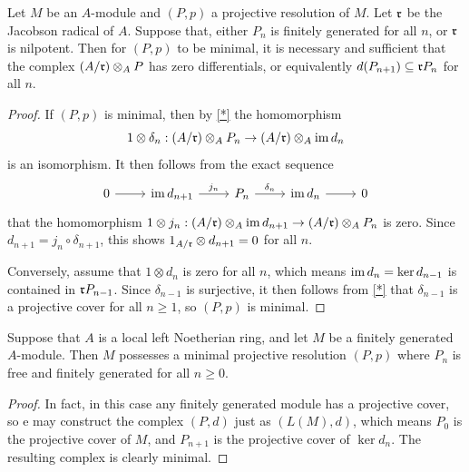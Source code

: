 \begin{proposition}\label{module minima projective resolution iff tensor with A/r}
Let $M$ be an $A$-module and $(P,p)$ a projective resolution of $M$. Let $\mathfrak{r}$ be the Jacobson radical of $A$. Suppose that, either $P_n$ is finitely generated for all $n$, or $\mathfrak{r}$ is nilpotent. Then for $(P,p)$ to be minimal, it is necessary and sufficient that the complex $(A/\mathfrak{r})\otimes_AP$ has zero differentials, or equivalently $d(P_{n+1})\subseteq\mathfrak{r} P_n$ for all $n$.
\end{proposition}
\begin{proof}
If $(P,p)$ is minimal, then by \cref{*} the homomorphism
\[1\otimes\delta_n:(A/\mathfrak{r})\otimes_AP_n\to(A/\mathfrak{r})\otimes_A\operatorname{im} d_n\]
is an isomorphism. It then follows from the exact sequence
\[\begin{tikzcd}
0\ar[r]&\im d_{n+1}\ar[r,"j_n"]&P_n\ar[r,"\delta_n"]&\im d_n\ar[r]&0
\end{tikzcd}\]
that the homomorphism $1\otimes j_n:(A/\mathfrak{r})\otimes_A\operatorname{im} d_{n+1}\to (A/\mathfrak{r})\otimes_AP_n$ is zero. Since $d_{n+1}=j_n\circ\delta_{n+1}$, this shows $1_{A/\mathfrak{r}}\otimes d_{n+1}=0$ for all $n$.\par 
Conversely, assume that $1\otimes d_n$ is zero for all $n$, which means $\operatorname{im} d_n=\operatorname{ker} d_{n-1}$ is contained in $\mathfrak{r} P_{n-1}$. Since $\delta_{n-1}$ is surjective, it then follows from \cref{*} that $\delta_{n-1}$ is a projective cover for all $n\geq 1$, so $(P,p)$ is minimal.
\end{proof}
\begin{proposition}\label{module minimal projective resolution exist for Noe local}
Suppose that $A$ is a local left Noetherian ring, and let $M$ be a finitely generated $A$-module. Then $M$ possesses a minimal projective resolution $(P,p)$ where $P_n$ is free and finitely generated for all $n\geq 0$.
\end{proposition}
\begin{proof}
In fact, in this case any finitely generated module has a projective cover, so e may construct the complex $(P,d)$ just as $(L(M),d)$, which means $P_0$ is the projective cover of $M$, and $P_{n+1}$ is the projective cover of $\ker d_n$. The resulting complex is clearly minimal.
\end{proof}
